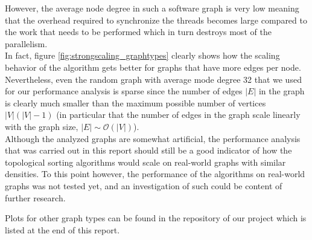 However, the average node degree in such a software graph is very low meaning that the overhead required to synchronize the threads becomes large compared to the work that needs to be performed which in turn destroys most of the parallelism. \\
In fact, figure \ref{fig:strongscaling_graphtypes} clearly shows how the scaling behavior of the algorithm gets better for graphs that have more edges per node.
Nevertheless, even the random graph with average mode degree 32 that we used for our performance analysis is sparse since the number of edges $|E|$ in the graph is clearly much smaller than the maximum possible number of vertices $|V|(|V|-1)$ (in particular that the number of edges in the graph scale linearly with the graph size, $|E| \sim \mathcal{O} ( |V| )$). \\
Although the analyzed graphs are somewhat artificial, the performance analysis that was carried out in this report should still be a good indicator of how the topological sorting algorithms would scale on real-world graphs with similar densities.
To this point however, the performance of the algorithms on real-world graphs was not tested yet, and an investigation of such could be content of further research.
\par\medskip
%
Plots for other graph types can be found in the repository of our project which is listed at the end of this report.
\par\medskip
